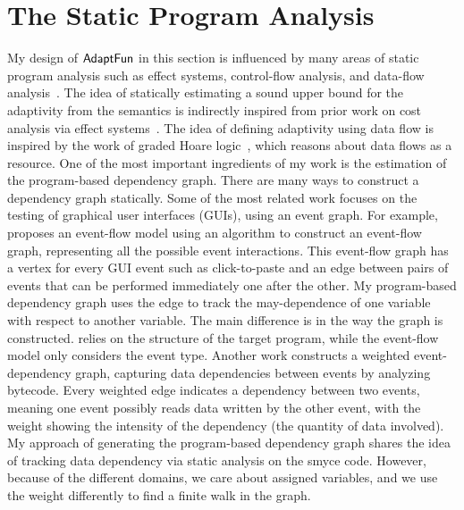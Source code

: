 \section{The Static Program Analysis}
\label{sec:relatedwork-adapt-static}
My design of $\textsf{AdaptFun}$ in this section is influenced by many areas of static program analysis such as 
effect systems, control-flow analysis, and data-flow analysis~\cite{ryder1988incremental}. 
The idea of statically estimating a sound upper bound for the adaptivity from the semantics is indirectly inspired from prior work on cost analysis via effect systems~\cite{cciccek2017relational,radivcek2017monadic,qu2019relational}. The idea of defining adaptivity using data flow is inspired by the work of graded 
Hoare logic~\cite{gaboardi2021graded}, which reasons about data flows as a resource. 
%
One of the most important ingredients of my work is the estimation of the program-based dependency graph. 
There are many ways to construct a dependency graph statically.
Some of the most related work focuses on the testing of graphical user interfaces (GUIs), using an event graph. For example, \cite{memon2007event} proposes an event-flow model using an algorithm to construct an event-flow graph, representing all the possible event interactions. 
This event-flow graph has a vertex for every GUI event such as click-to-paste and an edge between pairs of events that can be performed immediately one after the other. My program-based dependency graph uses the edge to track the may-dependence of one variable with respect to another variable. 
The main difference is in the way the graph is constructed. {\THESYSTEM} relies on the structure of the target program, while the event-flow model only considers the event type. 
Another work \cite{arlt2012lightweight} constructs a weighted event-dependency graph, capturing data dependencies between events by analyzing bytecode. 
Every weighted edge indicates a dependency between two events, meaning one event possibly reads data written by the other event, with the weight showing the intensity of the dependency (the quantity of data involved). 
My approach of generating the program-based dependency graph shares the idea of tracking data dependency via static analysis on the smyce code. 
However, because of the different domains, we care about assigned variables, and we use the weight differently to find a finite walk in the graph.

